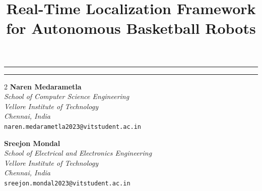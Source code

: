 \documentclass[a4paper]{article}
\title{Real-Time Localization Framework for Autonomous Basketball Robots}
\date{}
\makeatletter
\renewcommand{\maketitle}{{
  \begin{center}
    \noindent\rule{\textwidth}{1pt}\par
    \vspace{0.3em}
    {\LARGE \bfseries \@title \par}
    \vspace{0.3em}
    \noindent\rule{\textwidth}{1pt}\par
  \end{center}
}}
\makeatother
\begin{document}
\maketitle
\vspace{1cm}


\begin{multicols}{2}
    \centering
    \textbf{Naren Medarametla}\\
    \textit{School of Computer Science Engineering}\\
    \textit{Vellore Institute of Technology}\\
    \textit{Chennai, India}\\
    \texttt{naren.medarametla2023@vitstudent.ac.in}
    \vfill\null

    \columnbreak

    \textbf{Sreejon Mondal}\\
    \textit{School of Electrical and Electronics Engineering}\\
    \textit{Vellore Institute of Technology}\\
    \textit{Chennai, India}\\
    \texttt{sreejon.mondal2023@vitstudent.ac.in}
    \vfill\null
\end{multicols}

\singlespacing
\setlength{\parskip}{6pt}
\setlength{\parindent}{0.5cm}
\end{document}
